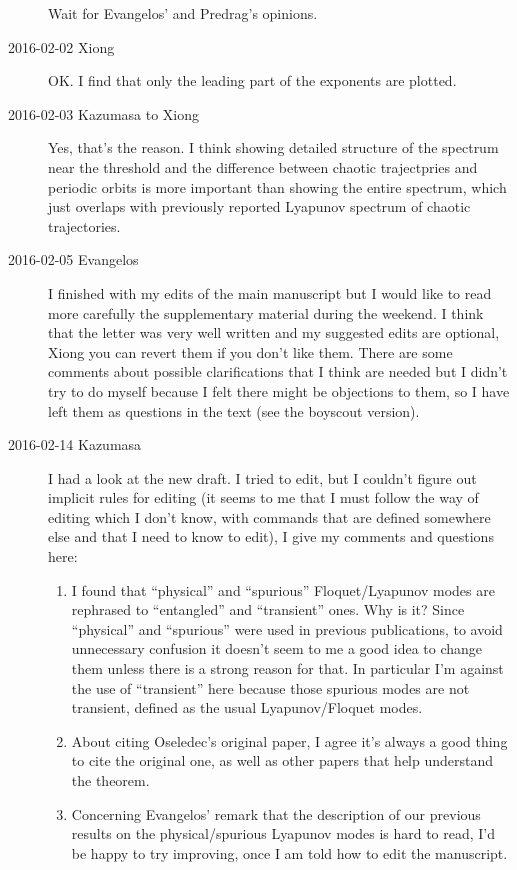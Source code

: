 \begin{description}
Wait for Evangelos' and Predrag's opinions.

\item[2016-02-02 Xiong]
OK. I find that only the leading part of the exponents are plotted.

\item[2016-02-03 Kazumasa to Xiong]
Yes, that's the reason. I think showing detailed structure of the spectrum near the threshold and the difference between chaotic trajectpries and periodic orbits is more important than showing the entire spectrum, which just overlaps with previously reported Lyapunov spectrum of chaotic trajectories.

\item[2016-02-05 Evangelos]
I finished with my edits of the main manuscript but I would like to read more carefully the supplementary material during the weekend.
I think that the letter was very well written and my suggested edits are optional, Xiong you can revert them if you don't like them.
There are some comments about possible clarifications that I think are needed but I didn't try to do myself because I felt there might
be objections to them, so I have left them as questions in the text (see the boyscout version).

\item[2016-02-14 Kazumasa]
I had a look at the new draft.
I tried to edit, but I couldn't figure out implicit rules for editing
(it seems to me that I must follow the way of editing which I don't know, with commands that are defined somewhere else and that I need to know to edit),
I give my comments and questions here:

\begin{enumerate}
\item
I found that ``physical'' and ``spurious'' Floquet/Lyapunov modes are rephrased to ``entangled'' and ``transient'' ones. Why is it? Since ``physical'' and ``spurious'' were used in previous publications, to avoid unnecessary confusion it doesn't seem to me a good idea to change them unless there is a strong reason for that. In particular I'm against the use of ``transient'' here because those spurious modes are not transient, defined as the usual Lyapunov/Floquet modes.

\item
About citing Oseledec's original paper, I agree it's always a good thing to cite the original one, as well as other papers that help understand the theorem.

\item
Concerning Evangelos' remark that the description of our previous results on the physical/spurious Lyapunov modes is hard to read, I'd be happy to try improving, once I am told how to edit the manuscript.


\end{enumerate}
\end{description}
